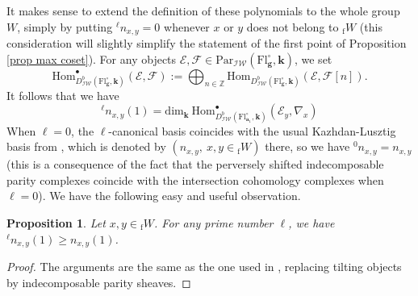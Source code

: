 \documentclass[11pt]{amsart}
\theoremstyle{plain}
\newtheorem{prop}[thm]{Proposition}
\theoremstyle{remark}
\numberwithin{equation}{section}
\begin{document}
	It makes sense to extend the definition of these polynomials to the whole group $W$, simply by putting ${^\ell n}_{x,y}=0$ whenever $x$ or $y$ does not belong to ${_\mathrm{f}W}$ (this consideration will slightly simplify the statement of the first point of Proposition \ref{prop max coset}). For any objects $\mathcal{E},\mathcal{F}\in \mathrm{Par}_{\mathcal{IW}}(\mathrm{Fl}^{\circ}_{\mathbf{g}},\mathbf{k})$, we set $$\mathrm{Hom}_{D^b_{\mathcal{IW}}(\mathrm{Fl}^{\circ}_{\mathbf{g}},\mathbf{k})}^\bullet(\mathcal{E},\mathcal{F}):=\bigoplus_{n\in\mathbb{Z}}\mathrm{Hom}_{D^b_{\mathcal{IW}}(\mathrm{Fl}^{\circ}_{\mathbf{g}},\mathbf{k})}(\mathcal{E},\mathcal{F}[n]).$$ It follows that we have 
	\begin{equation}\label{l-KL}
		{^\ell n}_{x,y}(1)=\mathrm{dim}_\mathbf{k}~\mathrm{Hom}_{D^b_{\mathcal{IW}}(\mathrm{Fl}^{\circ}_{\mathbf{a}_1},\mathbf{k})}^\bullet(\mathcal{E}_y,\nabla_x)
	\end{equation}
	When $\ell=0$, the $\ell$-canonical basis coincides with the usual Kazhdan-Lusztig basis from \cite[Theorem 3.1]{Soergel1997KazhdanLusztigPA}, which is denoted by $(n_{x,y},~x,y\in {_\mathrm{f}W})$ there, so we have ${^0n}_{x,y}= {n}_{x,y}$ (this is a consequence of the fact that the perversely shifted indecomposable parity complexes coincide with the intersection cohomology complexes when $\ell=0$). We have the following easy and useful observation.
	\begin{prop}\label{car 0}
		Let $x,y\in {_\mathrm{f}W}$. For any prime number $\ell$, we have ${^\ell n}_{x,y}(1)\geq {n}_{x,y}(1)$.
	\end{prop}
	\begin{proof}
	    The arguments are the same as the one used in \cite[Lemma 3.4]{achar2022geometric}, replacing tilting objects by indecomposable parity sheaves.
	\end{proof}
	
	
	
\end{document}
